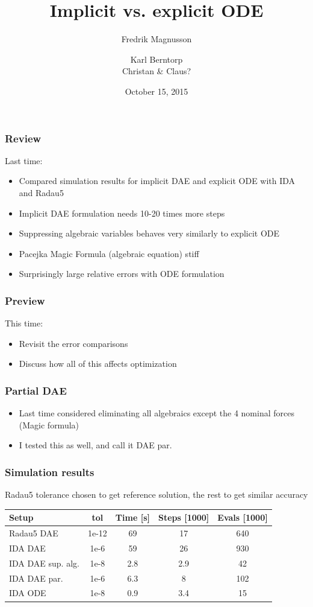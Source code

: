 \documentclass[]{beamer}
\title{Implicit vs. explicit ODE}
\author{Fredrik Magnusson\inst{1} \and Karl Berntorp\inst{2} \\ Christan \& Claus?}
\institute
{
\inst{1} Department of Automatic Control \\
Lund University, Sweden \\
\vspace{14pt}
\inst{2} Mitsubishi Electric Research Laboratories \\
Cambridge, MA \\
\vspace{14pt}
\insertdate
}
\date{October 15, 2015}
\begin{document}
{
\begin{frame}[noframenumbering]
    \titlepage
\end{frame}
}

\begin{frame}
\frametitle{Review}
Last time:
\begin{itemize}
\item
Compared simulation results for implicit DAE and explicit ODE with IDA and Radau5
\item
Implicit DAE formulation needs 10-20 times more steps
\item
Suppressing algebraic variables behaves very similarly to explicit ODE
\item
Pacejka Magic Formula (algebraic equation) stiff
\item
Surprisingly large relative errors with ODE formulation
\end{itemize}
\end{frame}

\begin{frame}
\frametitle{Preview}
This time:
\begin{itemize}
\item
Revisit the error comparisons
\item
Discuss how all of this affects optimization
\end{itemize}
\end{frame}

\begin{frame}
\frametitle{Partial DAE}
\begin{itemize}
\item
Last time considered eliminating all algebraics except the 4 nominal forces (Magic formula)
\item
I tested this as well, and call it DAE par.
\end{itemize}
\end{frame}

\begin{frame}
\frametitle{Simulation results}
Radau5 tolerance chosen to get reference solution, the rest to get similar accuracy

\begin{table}
\centering
\begin{tabular}{lcccc}
\toprule
Setup & tol & Time [s] & Steps [1000] & Evals [1000] \\
\midrule
Radau5 DAE & 1e-12 & 69 & 17 & 640 \\
IDA DAE & 1e-6 & 59 & 26 & 930 \\
IDA DAE sup. alg. & 1e-8 & 2.8 & 2.9 & 42 \\
IDA DAE par. & 1e-6 & 6.3 & 8 & 102 \\
IDA ODE & 1e-8 & 0.9 & 3.4 & 15 \\
\bottomrule
\end{tabular}
\end{table}
\end{frame}
\end{document}
